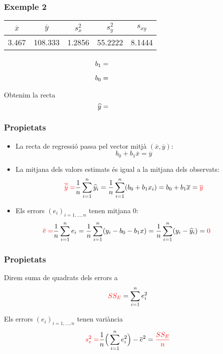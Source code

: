 \documentclass[12pt,t]{beamer}
\newcommand{\red}[1]{\textcolor{red}{#1}}
\renewcommand{\emph}[1]{{\color{red}#1}}
\theoremstyle{plain}
\theoremstyle{definition}
\begin{document}
\begin{frame}
\frametitle{Exemple 2}

\begin{center}
\begin{tabular}{ccccc}
$\overline{x}$ &  $\overline{y}$ & $s_x^2$ & $s_y^2$ & $s_{xy}$\\ \hline
3.467 & 108.333 & 1.2856 &55.2222 & 8.1444
\end{tabular}
\end{center}
\bigskip

$$
\begin{array}{l}
\displaystyle b_1 =\vphantom{\frac{s_{xy}}{s_x^2}}\hphantom{\overline{y}-b_1 \overline{x} = 86.371}\\[2ex]
\displaystyle b_0 =\hphantom{\overline{y}-b_1 \overline{x} = 86.371}
\end{array}
$$
\bigskip

Obtenim la recta
$$
\widehat{y}= \hphantom{86.371+6.335x}
$$

\end{frame}


\begin{frame}
\frametitle{Propietats}

\begin{itemize}
\item La recta de regressió passa pel vector mitjà
$(\overline{x},\overline{y})$:
$$
b_0+b_1 \overline{x}=\overline{y}
$$

\item La mitjana dels valors estimats és igual a la mitjana dels
observats:
$$
\red{\overline{\widehat{y}}=}\frac{1}{n}\sum_{i=1}^n\widehat{y}_i
=\frac{1}{n}\sum_{i=1}^n(b_0+b_1x_i)=
b_0+b_1 \overline{x}=\red{\overline{y}}
$$

\item Els errors $(e_i)_{i=1,\ldots,n}$ tenen mitjana 0:
$$
\hspace*{-0.7cm}\red{\overline{e}
=}\frac{1}{n}\sum_{i=1}^n e_i
=\frac{1}{n}\sum_{i=1}^n (y_i-b_0-b_1x)
=\frac{1}{n}\sum_{i=1}^n (y_i-\widehat{y}_i)
=\red{0}
$$
\end{itemize}
\end{frame}



\begin{frame}
\frametitle{Propietats}
Direm \emph{suma de quadrats dels errors} a
$$
\red{SS_E}=\sum_{i=1}^{n} e^2_i
$$
\medskip

Els errors $(e_i)_{i=1,\ldots,n}$ tenen variància
$$
\red{s_e^2=}\frac{1}{n}\Big(\sum_{i=1}^{n}
e^2_i\Big)-\overline{e}^2=\red{\frac{SS_E}{n}}
$$

\end{frame}
\end{document}
